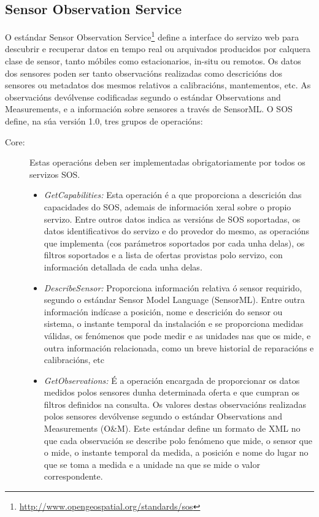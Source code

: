 \subsection{Sensor Observation Service}
O estándar Sensor Observation Service\footnote{\url{http://www.opengeospatial.org/standards/sos}} define a interface do servizo web para descubrir e recuperar datos en tempo real ou arquivados producidos por calquera clase de sensor, tanto móbiles como estacionarios, in-situ ou remotos. Os datos dos sensores poden ser tanto observacións realizadas como descricións dos sensores ou metadatos dos mesmos relativos a calibracións, mantementos, etc. As observacións devólvense codificadas segundo o estándar Observations and Measurements, e a información sobre sensores a través de SensorML. O SOS define, na súa versión 1.0, tres grupos de operacións:
\begin{description}
\item[Core:] Estas operacións deben ser implementadas obrigatoriamente por todos os servizos SOS.
\begin{itemize}
\item \textit{GetCapabilities:} Esta operación é a que proporciona a descrición das capacidades do SOS, ademais de información xeral sobre o propio servizo. Entre outros datos indica as versións de SOS soportadas, os datos identificativos do servizo e do provedor do mesmo, as operacións que implementa (cos parámetros soportados por cada unha delas), os filtros soportados e a lista de ofertas provistas polo servizo, con información detallada de cada unha delas.
\item \textit{DescribeSensor:} Proporciona información relativa ó sensor requirido, segundo o estándar Sensor Model Language (SensorML). Entre outra información indícase a posición, nome e descrición do sensor ou sistema, o instante temporal da instalación e se proporciona medidas válidas, os fenómenos que pode medir e as unidades nas que os mide, e outra información relacionada, como un breve historial de reparacións e
calibracións, etc
\item \textit{GetObservations:} É a operación encargada de proporcionar os datos medidos polos sensores dunha determinada oferta e que cumpran os filtros definidos na consulta. Os valores destas observacións realizadas polos sensores devólvense segundo o estándar Observations and Measurements (O\&M). Este estándar define un formato de XML no que cada observación se describe polo fenómeno que mide, o sensor que o mide, o instante temporal da medida, a posición e nome do lugar no que se toma a medida e a unidade na que se mide o valor correspondente.

\end{itemize}
\end{description}

